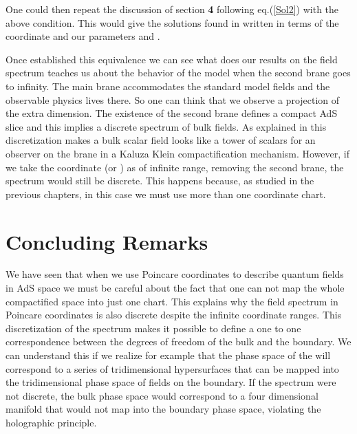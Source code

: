 \documentclass[a4paper,12pt]{article}
\begin{document}
\noindent  One could then repeat the discussion of section {\bf 4} 
following eq.(\ref{Sol2}) with the above condition. This would give 
the solutions found in \cite{GW1} written in terms of the coordinate 
\coordHE{} and our parameters \coordHE{} and \myHighlight{$\Lambda$}\coordHE{}.

Once established this equivalence we can see what does our results  
on the field spectrum teaches us about the behavior of the model
when the second brane goes to infinity. 
The main brane accommodates the standard 
model fields and the observable physics lives there.
So one can think that we observe a projection of the extra dimension.
The existence of the second 
brane defines a compact AdS slice and this implies a discrete 
spectrum of bulk fields. As explained in \cite{GW1} this discretization 
makes a bulk scalar field looks like a tower of scalars for an observer on
the brane in a Kaluza Klein compactification mechanism. However,
if we take the coordinate \coordHE{} (or \coordHE{}) as of
infinite range, removing the second brane, the spectrum would still 
be discrete.
This happens because, as studied in the previous
chapters, in this case we must use more than one coordinate chart.

  
 
\section{Concluding Remarks}

We have seen that when we use Poincare coordinates to describe 
quantum fields in AdS space we must be careful about the fact that
one can not map the whole compactified space into just one chart.
This explains why the field spectrum in Poincare coordinates is also 
discrete despite the infinite coordinate ranges.
This discretization of the spectrum makes it possible 
to define a one to one correspondence between the degrees of 
freedom of the bulk and the boundary. 
We can understand this if we realize for example that the phase space
of the \coordHE{}  will correspond to a series of tridimensional hypersurfaces
that can be mapped into the tridimensional phase space of fields on 
the boundary.
If the spectrum were not discrete, the bulk phase space would correspond
 to a four dimensional manifold that would not map into the boundary 
phase space, violating the holographic principle.
\end{document}
